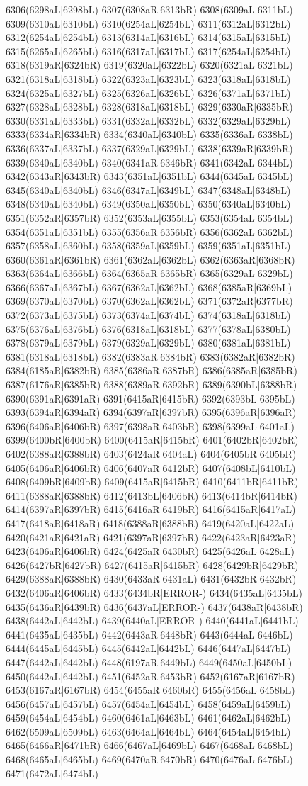 6306(6298aL|6298bL) 6307(6308aR|6313bR) 6308(6309aL|6311bL) 6309(6310aL|6310bL) 6310(6254aL|6254bL) 6311(6312aL|6312bL) 6312(6254aL|6254bL) 6313(6314aL|6316bL) 6314(6315aL|6315bL) 6315(6265aL|6265bL) 6316(6317aL|6317bL) 6317(6254aL|6254bL) 6318(6319aR|6324bR) 6319(6320aL|6322bL) 6320(6321aL|6321bL) 6321(6318aL|6318bL) 6322(6323aL|6323bL) 6323(6318aL|6318bL) 6324(6325aL|6327bL) 6325(6326aL|6326bL) 6326(6371aL|6371bL) 6327(6328aL|6328bL) 6328(6318aL|6318bL) 6329(6330aR|6335bR) 6330(6331aL|6333bL) 6331(6332aL|6332bL) 6332(6329aL|6329bL) 6333(6334aR|6334bR) 6334(6340aL|6340bL) 6335(6336aL|6338bL) 6336(6337aL|6337bL) 6337(6329aL|6329bL) 6338(6339aR|6339bR) 6339(6340aL|6340bL) 6340(6341aR|6346bR) 6341(6342aL|6344bL) 6342(6343aR|6343bR) 6343(6351aL|6351bL) 6344(6345aL|6345bL) 6345(6340aL|6340bL) 6346(6347aL|6349bL) 6347(6348aL|6348bL) 6348(6340aL|6340bL) 6349(6350aL|6350bL) 6350(6340aL|6340bL) 6351(6352aR|6357bR) 6352(6353aL|6355bL) 6353(6354aL|6354bL) 6354(6351aL|6351bL) 6355(6356aR|6356bR) 6356(6362aL|6362bL) 6357(6358aL|6360bL) 6358(6359aL|6359bL) 6359(6351aL|6351bL) 6360(6361aR|6361bR) 6361(6362aL|6362bL) 6362(6363aR|6368bR) 6363(6364aL|6366bL) 6364(6365aR|6365bR) 6365(6329aL|6329bL) 6366(6367aL|6367bL) 6367(6362aL|6362bL) 6368(6385aR|6369bL) 6369(6370aL|6370bL) 6370(6362aL|6362bL) 6371(6372aR|6377bR) 6372(6373aL|6375bL) 6373(6374aL|6374bL) 6374(6318aL|6318bL) 6375(6376aL|6376bL) 6376(6318aL|6318bL) 6377(6378aL|6380bL) 6378(6379aL|6379bL) 6379(6329aL|6329bL) 6380(6381aL|6381bL) 6381(6318aL|6318bL) 6382(6383aR|6384bR) 6383(6382aR|6382bR) 6384(6185aR|6382bR) 6385(6386aR|6387bR) 6386(6385aR|6385bR) 6387(6176aR|6385bR) 6388(6389aR|6392bR) 6389(6390bL|6388bR) 6390(6391aR|6391aR) 6391(6415aR|6415bR) 6392(6393bL|6395bL) 6393(6394aR|6394aR) 6394(6397aR|6397bR) 6395(6396aR|6396aR) 6396(6406aR|6406bR) 6397(6398aR|6403bR) 6398(6399aL|6401aL) 6399(6400bR|6400bR) 6400(6415aR|6415bR) 6401(6402bR|6402bR) 6402(6388aR|6388bR) 6403(6424aR|6404aL) 6404(6405bR|6405bR) 6405(6406aR|6406bR) 6406(6407aR|6412bR) 6407(6408bL|6410bL) 6408(6409bR|6409bR) 6409(6415aR|6415bR) 6410(6411bR|6411bR) 6411(6388aR|6388bR) 6412(6413bL|6406bR) 6413(6414bR|6414bR) 6414(6397aR|6397bR) 6415(6416aR|6419bR) 6416(6415aR|6417aL) 6417(6418aR|6418aR) 6418(6388aR|6388bR) 6419(6420aL|6422aL) 6420(6421aR|6421aR) 6421(6397aR|6397bR) 6422(6423aR|6423aR) 6423(6406aR|6406bR) 6424(6425aR|6430bR) 6425(6426aL|6428aL) 6426(6427bR|6427bR) 6427(6415aR|6415bR) 6428(6429bR|6429bR) 6429(6388aR|6388bR) 6430(6433aR|6431aL) 6431(6432bR|6432bR) 6432(6406aR|6406bR) 6433(6434bR|ERROR-) 6434(6435aL|6435bL) 6435(6436aR|6439bR) 6436(6437aL|ERROR-) 6437(6438aR|6438bR) 6438(6442aL|6442bL) 6439(6440aL|ERROR-) 6440(6441aL|6441bL) 6441(6435aL|6435bL) 6442(6443aR|6448bR) 6443(6444aL|6446bL) 6444(6445aL|6445bL) 6445(6442aL|6442bL) 6446(6447aL|6447bL) 6447(6442aL|6442bL) 6448(6197aR|6449bL) 6449(6450aL|6450bL) 6450(6442aL|6442bL) 6451(6452aR|6453bR) 6452(6167aR|6167bR) 6453(6167aR|6167bR) 6454(6455aR|6460bR) 6455(6456aL|6458bL) 6456(6457aL|6457bL) 6457(6454aL|6454bL) 6458(6459aL|6459bL) 6459(6454aL|6454bL) 6460(6461aL|6463bL) 6461(6462aL|6462bL) 6462(6509aL|6509bL) 6463(6464aL|6464bL) 6464(6454aL|6454bL) 6465(6466aR|6471bR) 6466(6467aL|6469bL) 6467(6468aL|6468bL) 6468(6465aL|6465bL) 6469(6470aR|6470bR) 6470(6476aL|6476bL) 6471(6472aL|6474bL) 